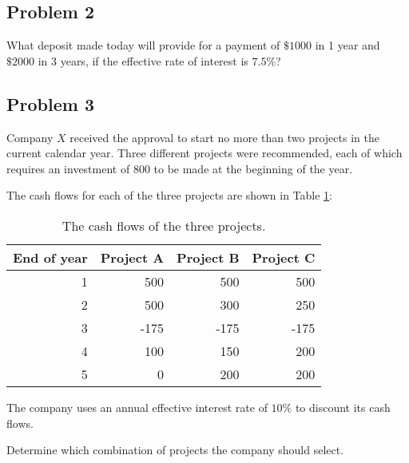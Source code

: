 \documentclass[
]{book}
\begin{document}
\hypertarget{problem-2-1}{%
\subsection*{Problem 2}\label{problem-2-1}}

What deposit made today will provide for a payment of \(\$1000\) in 1 year and \(\$2000\) in 3 years, if the effective rate of interest is \(7.5\%\)?

\hypertarget{problem-3-1}{%
\subsection*{Problem 3}\label{problem-3-1}}

Company \(X\) received the approval to start no more than two projects in the current calendar year.
Three different projects were recommended, each of which requires an investment of 800 to be made at the beginning of the year.

The cash flows for each of the three projects are shown in Table \ref{tab:week1}:

\begin{table}

\caption{\label{tab:week1}The cash flows of the three projects.}
\centering
\begin{tabular}[t]{r|r|r|r}
\hline
End of year & Project A & Project B & Project C\\
\hline
1 & 500 & 500 & 500\\
\hline
2 & 500 & 300 & 250\\
\hline
3 & -175 & -175 & -175\\
\hline
4 & 100 & 150 & 200\\
\hline
5 & 0 & 200 & 200\\
\hline
\end{tabular}
\end{table}

The company uses an annual effective interest rate of \(10\%\) to discount its cash flows.

Determine which combination of projects the company should select.

  
\end{document}
